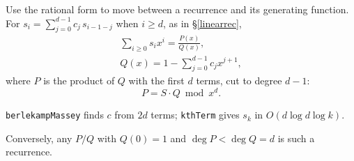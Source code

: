 {\begin{facts}
\end{facts}
Use the rational form to move between a recurrence and its generating function.
For $s_i = \sum_{j=0}^{d-1} c_j\, s_{i-1-j}$ when $i \ge d$, as in \S\ref{linearrec},
\begin{gather*} \sum_{i \ge 0} s_i x^i = \frac{P(x)}{Q(x)}, \\ Q(x) = 1 - \sum_{j=0}^{d-1} c_j x^{j+1}, \end{gather*}
where $P$ is the product of $Q$ with the first $d$ terms, cut to degree $d - 1$:
\[ P = S \cdot Q \bmod x^d. \]
\begin{facts}
	\item \texttt{berlekampMassey} finds $c$ from $2d$ terms; \texttt{kthTerm} gives $s_k$ in $O(d \log d \log k)$.
	\item Conversely, any $P/Q$ with $Q(0) = 1$ and $\deg P < \deg Q = d$ is such a recurrence.
\end{facts}
}
\label{mathgames}
